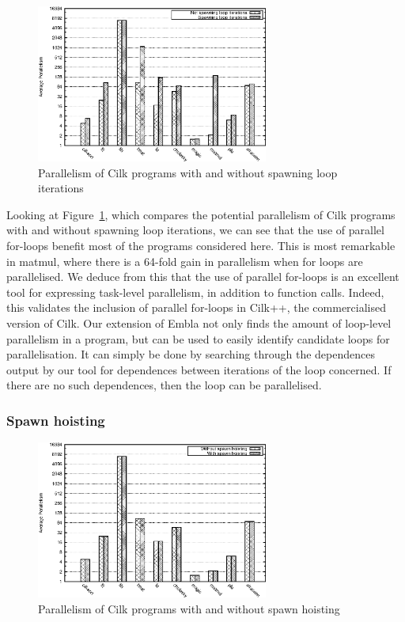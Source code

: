 \begin{figure}
 \centering
 \includegraphics[width=3in]{cilk-loop}
 \caption{Parallelism of Cilk programs with and without spawning loop iterations}
 \label{cilk-loop}
\end{figure}

Looking at Figure~\ref{cilk-loop}, which compares the potential parallelism of Cilk programs with and without spawning loop iterations, we can see that the use of parallel for-loops benefit most of the programs considered here.
This is most remarkable in matmul, where there is a 64-fold gain in parallelism when for loops are parallelised.
We deduce from this that the use of parallel for-loops is an excellent tool for expressing task-level parallelism, in addition to function calls.
Indeed, this validates the inclusion of parallel for-loops in Cilk++, the commercialised version of Cilk.
Our extension of Embla not only finds the amount of loop-level parallelism in a program, but can be used to easily identify candidate loops for parallelisation.
It can simply be done by searching through the dependences output by our tool for dependences between iterations of the loop concerned.
If there are no such dependences, then the loop can be parallelised.

\subsubsection{Spawn hoisting}

\begin{figure}
 \centering
 \includegraphics[width=3in]{cilk-hoist}
 \caption{Parallelism of Cilk programs with and without spawn hoisting}
 \label{cilk-hoist}
\end{figure}

